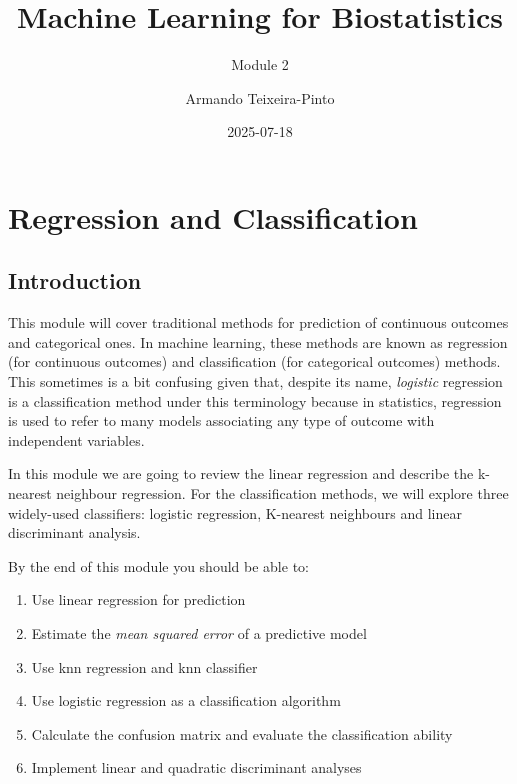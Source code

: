 \documentclass[
]{book}
\title{Machine Learning for Biostatistics}
\subtitle{Module 2}
\author{Armando Teixeira-Pinto}
\date{2025-07-18}
\providecommand{\tightlist}{%
  \setlength{\itemsep}{0pt}\setlength{\parskip}{0pt}}
\begin{document}
\maketitle

{
\setcounter{tocdepth}{1}
\tableofcontents
}
\chapter*{Regression and Classification}\label{regression-and-classification}

\section*{Introduction}\label{introduction}

This module will cover traditional methods for prediction of continuous outcomes
and categorical ones. In machine learning, these methods are known as
regression (for continuous outcomes) and classification (for categorical
outcomes) methods. This sometimes is a bit confusing given that,
despite its name, \emph{logistic} regression is a classification method under
this terminology because in statistics, regression is used to refer to many models
associating any type of outcome with independent variables.

In this module we are going to review the linear regression and describe the
k-nearest neighbour regression. For the classification methods, we will explore
three widely-used classifiers: logistic regression, K-nearest neighbours and
linear discriminant analysis.

By the end of this module you should be able to:

\begin{enumerate}
\def\labelenumi{\arabic{enumi}.}
\tightlist
\item
  Use linear regression for prediction
\item
  Estimate the \emph{mean squared error} of a predictive model
\item
  Use knn regression and knn classifier
\item
  Use logistic regression as a classification algorithm
\item
  Calculate the confusion matrix and evaluate the classification ability
\item
  Implement linear and quadratic discriminant analyses
\end{enumerate}
\end{document}
